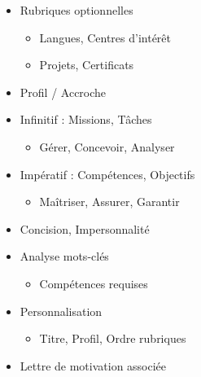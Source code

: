 \documentclass[11pt]{article}
\begin{document}
\begin{popfigure}
\begin{tcbraster}[raster columns=2,raster equal height=rows,raster column skip=6pt,raster row skip=6pt,enhanced,blankest]
\begin{tcolorbox}
\begin{itemize}[nosep,leftmargin=*,itemsep=1pt,font=\scriptsize]
\begin{itemize}[nosep,leftmargin=1.1em,itemsep=0pt]
\end{itemize}
\item Rubriques optionnelles
\begin{itemize}[nosep,leftmargin=1.1em,itemsep=0pt]
\item Langues, Centres d'intérêt
\item Projets, Certificats
\end{itemize}
\item Profil / Accroche
\end{itemize}
\end{tcolorbox}
\begin{tcolorbox}[enhanced,colback=white,colframe=poppurple,boxrule=0.9pt,arc=3pt,title={Langue : Modes},fonttitle=\bfseries\scriptsize,coltitle=white,colbacktitle=poppurple,left=4pt,right=4pt,top=2pt,bottom=2pt,boxsep=1pt,toptitle=1.5pt,bottomtitle=1.5pt,halign=left]
\begin{itemize}[nosep,leftmargin=*,itemsep=1pt,font=\scriptsize]
\item Infinitif : Missions, Tâches
\begin{itemize}[nosep,leftmargin=1.1em,itemsep=0pt]
\item Gérer, Concevoir, Analyser
\end{itemize}
\item Impératif : Compétences, Objectifs
\begin{itemize}[nosep,leftmargin=1.1em,itemsep=0pt]
\item Maîtriser, Assurer, Garantir
\end{itemize}
\item Concision, Impersonnalité
\end{itemize}
\end{tcolorbox}
\begin{tcolorbox}[enhanced,colback=white,colframe=poppink,boxrule=0.9pt,arc=3pt,title={Adaptation à l'Offre},fonttitle=\bfseries\scriptsize,coltitle=white,colbacktitle=poppink,left=4pt,right=4pt,top=2pt,bottom=2pt,boxsep=1pt,toptitle=1.5pt,bottomtitle=1.5pt,halign=left]
\begin{itemize}[nosep,leftmargin=*,itemsep=1pt,font=\scriptsize]
\item Analyse mots-clés
\begin{itemize}[nosep,leftmargin=1.1em,itemsep=0pt]
\item Compétences requises
\end{itemize}
\item Personnalisation
\begin{itemize}[nosep,leftmargin=1.1em,itemsep=0pt]
\item Titre, Profil, Ordre rubriques
\end{itemize}
\item Lettre de motivation associée
\end{itemize}
\end{tcolorbox}
\end{tcbraster}


\end{popfigure}
\end{document}
